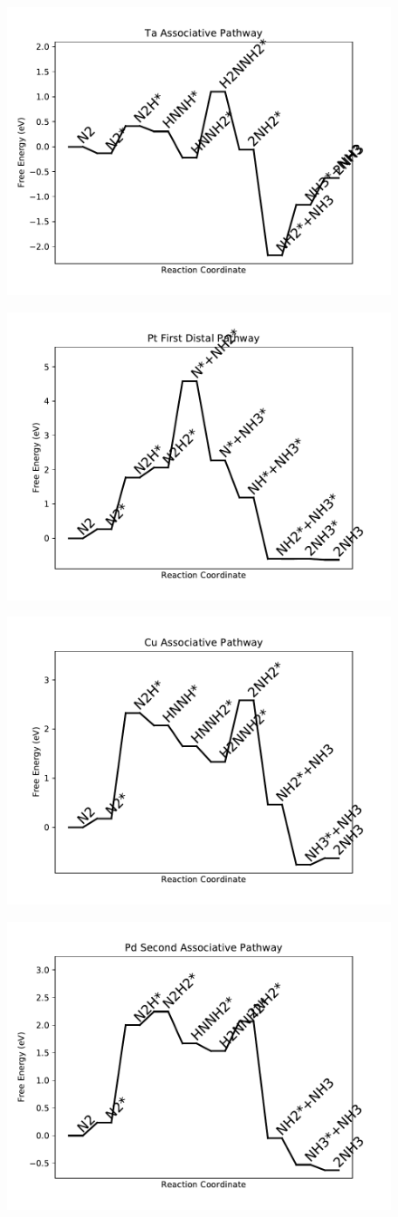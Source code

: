 \begin{figure}
\includegraphics[width=0.5\linewidth]{data/plots/Ta_associative.pdf}
\label{fig:Ta_associative}
\end{figure}

\begin{figure}
\includegraphics[width=0.5\linewidth]{data/plots/Pt_distal_1.pdf}
\label{fig:Pt_distal_1}
\end{figure}

\begin{figure}
\includegraphics[width=0.5\linewidth]{data/plots/Cu_associative.pdf}
\label{fig:Cu_associative}
\end{figure}

\begin{figure}
\includegraphics[width=0.5\linewidth]{data/plots/Pd_associative_2.pdf}
\label{fig:Pd_associative_2}
\end{figure}


